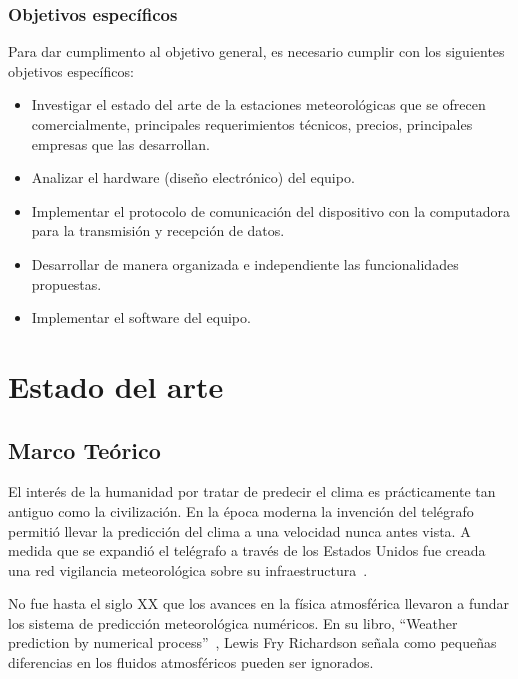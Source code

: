 \documentclass[12pt,letterpaper]{article}
\begin{document}
\begin{sloppypar}
        \subsubsection*{Objetivos específicos}
        Para dar cumplimento al objetivo general, es necesario cumplir con
        los siguientes objetivos específicos:
        \begin{itemize}
            \item Investigar el estado del arte de la estaciones
            meteorológicas que se ofrecen
            comercialmente, principales requerimientos técnicos, precios,
            principales
            empresas que las desarrollan.
            \item Analizar el hardware (diseño electrónico) del equipo.
            \item Implementar el protocolo de comunicación del dispositivo
            con la computadora
            para la transmisión y recepción de datos.
            \item Desarrollar de manera organizada e independiente las
            funcionalidades
            propuestas.
            \item Implementar el software del equipo.
        \end{itemize}

        \setcounter{secnumdepth}{3}


        \section{Estado del arte}

        \subsection{Marco Teórico}\label{subsec:antecedentes}
        El interés de la humanidad por tratar de predecir el clima es
        prácticamente tan
        antiguo como la civilización.
        En la época moderna la invención del telégrafo permitió llevar la
        predicción
        del clima a una velocidad nunca antes vista.
        A medida que se expandió el telégrafo a través de los Estados Unidos
        fue creada
        una red vigilancia meteorológica sobre su
        infraestructura~\cite{ThomasJeffersonTelegraph}.

        No fue hasta el siglo XX que los avances en la física atmosférica
        llevaron a
        fundar los sistema de predicción meteorológica numéricos.
        En su libro, ``Weather prediction by numerical
        process''~\cite{richardsonWeatherPredictionNumerical1922}, Lewis Fry
        Richardson
        señala como pequeñas diferencias en los fluidos atmosféricos pueden ser
        ignorados.


\end{sloppypar}
\end{document}
